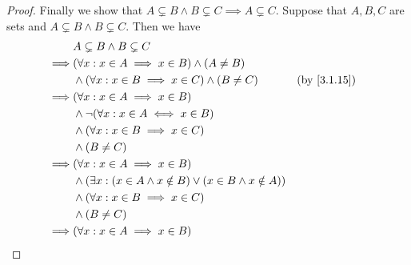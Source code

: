 \begin{proof}
  Finally we show that \(A \subsetneq B \land B \subsetneq C \implies A \subsetneq C\).
  Suppose that \(A, B, C\) are sets and \(A \subsetneq B \land B \subsetneq C\).
  Then we have
  \begin{align*}
             & A \subsetneq B \land B \subsetneq C                                                                                                         \\
    \implies & (\forall x : x \in A \implies x \in B) \land (A \neq B)                                                                                     \\
             & \land (\forall x : x \in B \implies x \in C) \land (B \neq C)                  &  & \by{3.1.15}                                             \\
    \implies & (\forall x : x \in A \implies x \in B)                                                                                                      \\
             & \land \lnot(\forall x : x \in A \iff x \in B)                                                                                               \\
             & \land (\forall x : x \in B \implies x \in C)                                                                                                \\
             & \land (B \neq C)                                                                                                                            \\
    \implies & (\forall x : x \in A \implies x \in B)                                                                                                      \\
             & \land (\exists x : (x \in A \land x \notin B) \lor (x \in B \land x \notin A))                                                              \\
             & \land (\forall x : x \in B \implies x \in C)                                                                                                \\
             & \land (B \neq C)                                                                                                                            \\
    \implies & (\forall x : x \in A \implies x \in B)                                                                                                      \\

\end{align*}
\end{proof}
